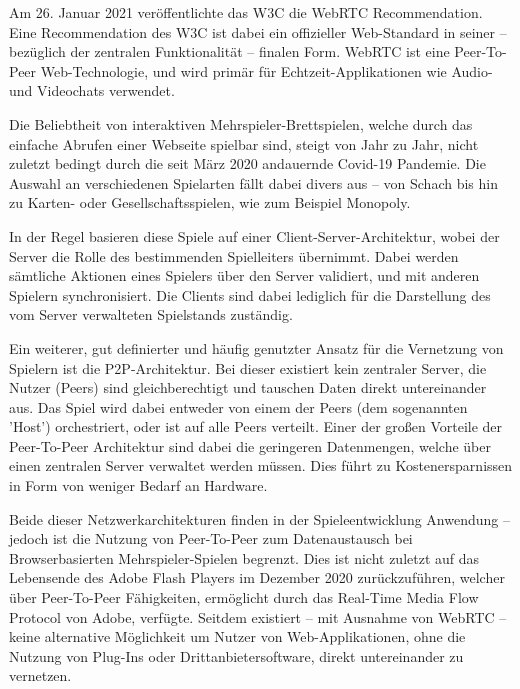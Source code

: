 Am 26. Januar 2021 veröffentlichte das \ac{W3C} die \ac{WebRTC} Recommendation. Eine Recommendation des \acs{W3C} ist dabei ein offizieller Web-Standard in seiner -- bezüglich der zentralen Funktionalität -- finalen Form. \acs{WebRTC} ist eine Peer-To-Peer Web-Technologie, und wird primär für Echtzeit-Applikationen wie Audio- und Videochats verwendet.\par

Die Beliebtheit von interaktiven Mehrspieler-Brettspielen, welche durch das einfache Abrufen einer Webseite spielbar sind, steigt von Jahr zu Jahr, nicht zuletzt bedingt durch die seit März 2020 andauernde Covid-19 Pandemie. Die Auswahl an verschiedenen Spielarten fällt dabei divers aus -- von Schach bis hin zu Karten- oder Gesellschaftsspielen, wie zum Beispiel Monopoly.\par

In der Regel basieren diese Spiele auf einer Client-Server-Architektur, wobei der Server die Rolle des bestimmenden Spielleiters übernimmt. Dabei werden sämtliche Aktionen eines Spielers über den Server validiert, und mit anderen Spielern synchronisiert. Die Clients sind dabei lediglich für die Darstellung des vom Server verwalteten Spielstands zuständig.\cite{bura2012}\par

Ein weiterer, gut definierter und häufig genutzter Ansatz für die Vernetzung von Spielern ist die \acf{P2P}-Architektur. Bei dieser existiert kein zentraler Server, die Nutzer (Peers) sind gleichberechtigt und tauschen Daten direkt untereinander aus. Das Spiel wird dabei entweder von einem der Peers (dem sogenannten 'Host') orchestriert, oder ist auf alle Peers verteilt. Einer der großen Vorteile der Peer-To-Peer Architektur sind dabei die geringeren Datenmengen, welche über einen zentralen Server verwaltet werden müssen. Dies führt zu Kostenersparnissen in Form von weniger Bedarf an Hardware.\par

Beide dieser Netzwerkarchitekturen finden in der Spieleentwicklung Anwendung -- jedoch ist die Nutzung von Peer-To-Peer zum Datenaustausch bei Browserbasierten Mehrspieler-Spielen begrenzt. Dies ist nicht zuletzt auf das Lebensende des Adobe Flash Players im Dezember 2020 zurückzuführen, welcher über Peer-To-Peer Fähigkeiten, ermöglicht durch das Real-Time Media Flow Protocol von Adobe, verfügte. Seitdem existiert -- mit Ausnahme von \acs{WebRTC} -- keine alternative Möglichkeit um Nutzer von Web-Applikationen, ohne die Nutzung von Plug-Ins oder Drittanbietersoftware, direkt untereinander zu vernetzen.\par

